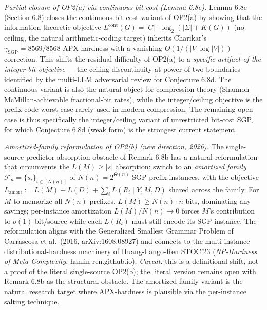 \documentclass[
]{article}
\begin{document}
\begin{itemize}
  \emph{Partial closure of OP2(a) via continuous bit-cost (Lemma 6.8e).}
  Lemma 6.8e (Section 6.8) closes the continuous-bit-cost variant of
  OP2(a) by showing that the information-theoretic objective
  $L^{\mathrm{cont}}(G) = |G| \cdot \log_2(|\Sigma| + K(G))$
  (no ceiling, the natural arithmetic-coding target) inherits Charikar's
  $\gamma_{\mathrm{SGP}} = 8569/8568$ APX-hardness with a vanishing
  $O(1/(|V|\log|V|))$ correction. This shifts the residual difficulty
  of OP2(a) to a \emph{specific artifact of the integer-bit objective}
  --- the ceiling discontinuity at power-of-two boundaries identified
  by the multi-LLM adversarial review for Conjecture 6.8d. The
  continuous variant is also the natural object for compression theory
  (Shannon-McMillan-achievable fractional-bit rates), while the
  integer/ceiling objective is the prefix-code worst case rarely
  used in modern compression. The remaining open case is thus
  specifically the integer/ceiling variant of unrestricted bit-cost SGP,
  for which Conjecture 6.8d (weak form) is the strongest current
  statement.

  \emph{Amortized-family reformulation of OP2(b) (new direction,
  2026).} The single-source predictor-absorption obstacle of
  Remark 6.8b has a natural reformulation that circumvents the
  $L(M) \geq |s|$ absorption: switch to an \emph{amortized family}
  $\mathcal{F}_n = \{s_i\}_{i \in [N(n)]}$ of $N(n) = 2^{\Theta(n)}$
  SGP-prefix instances, with the objective
  $L_{\mathrm{amort}} := L(M) + L(D) + \sum_i L(R_i \mid Y, M, D)$
  shared across the family. For $M$ to memorize all $N(n)$ prefixes,
  $L(M) \geq N(n) \cdot n$ bits, dominating any savings; per-instance
  amortization $L(M)/N(n) \to 0$ forces $M$'s contribution to
  $o(1)$ bit/source while each $L(R_i)$ must still encode its SGP-instance.
  The reformulation aligns with the Generalized Smallest Grammar
  Problem of Carrascosa et al.\ (2016, arXiv:1608.08927) and connects
  to the multi-instance distributional-hardness machinery of
  Huang-Ilango-Ren STOC'23 (\emph{NP-Hardness of Meta-Complexity},
  hanlin-ren.github.io). \emph{Caveat:} this is a definitional shift,
  not a proof of the literal single-source OP2(b); the literal version
  remains open with Remark 6.8b as the structural obstacle. The
  amortized-family variant is the natural research target where
  APX-hardness is plausible via the per-instance salting technique.


\end{itemize}
\end{document}
